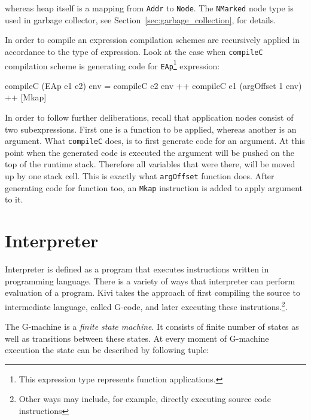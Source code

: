 \documentclass[12pt,a4paper]{report}
\begin{document}
whereas heap itself is a mapping from \texttt{Addr} to \texttt{Node}. The
\texttt{NMarked} node type is used in garbage collector, see
Section~\ref{sec:garbage_collection}, for details.

In order to compile an expression compilation schemes are recursively applied
in accordance to the type of expression. Look at the case when
\texttt{compileC} compilation scheme is generating code for
\texttt{EAp}\footnote{This expression type represents function applications.}
expression:

\vspace*{0.2in}
\begin{code}[style=haskell]
compileC (EAp e1 e2) env =
    compileC e2 env ++
    compileC e1 (argOffset 1 env) ++
    [Mkap]
\end{code}

In order to follow further deliberations, recall that application nodes consist
of two subexpressions. First one is a function to be applied, whereas another
is an argument. What \texttt{compileC} does, is to first generate code for an
argument. At this point when the generated code is executed the argument will
be pushed on the top of the runtime stack. Therefore all variables that were
there, will be moved up by one stack cell. This is exactly what
\texttt{argOffset} function does. After generating code for function too, an
\texttt{Mkap} instruction is added to apply argument to it.

%
%

\section{Interpreter}
\label{sec:interpreter}
Interpreter is defined as a program that executes instructions written in
programming language. There is a variety of ways that interpreter can perform
evaluation of a program. Kivi takes the approach of first compiling the source
to intermediate language, called G-code, and later executing these
instrutions.\footnote{Other ways may include, for example, directly executing
source code instructions}.

The G-machine is a \textit{finite state machine}. It consists of finite number
of states as well as transitions between these states. At every moment of
G-machine execution the state can be described by following tuple:
\end{document}
